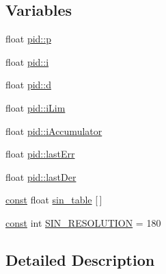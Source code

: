 \subsection*{Variables}
\begin{DoxyCompactItemize}
\item 
float \hyperlink{group___sine_ga8281b69c68be641d7b0dcf0322b3715f}{pid\-::p}
\item 
float \hyperlink{group___sine_ga97ebc09fc39d749940ebdc48926b8bb1}{pid\-::i}
\item 
float \hyperlink{group___sine_ga1c4d7f2ca382af4be8d036cc36bd9c31}{pid\-::d}
\item 
float \hyperlink{group___sine_ga2a3ee941dff64851693d27d04ece04f3}{pid\-::i\-Lim}
\item 
float \hyperlink{group___sine_gafb7f8463c8cefe80b65db478c349a0b1}{pid\-::i\-Accumulator}
\item 
float \hyperlink{group___sine_gab61187c1e1bf8e3f6b09501992bd744f}{pid\-::last\-Err}
\item 
float \hyperlink{group___sine_gae79ee69d35b5daccddb71cbe270fbbd1}{pid\-::last\-Der}
\item 
\hyperlink{group___n_a_m_e_ga7ae6d0e43244213b34de2c2b9aa30da6}{const} float \hyperlink{group___sine_ga70cc8b18ae100423fdb14030bc26eeb5}{sin\-\_\-table} \mbox{[}$\,$\mbox{]}
\item 
\hyperlink{group___n_a_m_e_ga7ae6d0e43244213b34de2c2b9aa30da6}{const} int \hyperlink{group___sine_gace095cad8be21b689623bd604ea20aaa}{S\-I\-N\-\_\-\-R\-E\-S\-O\-L\-U\-T\-I\-O\-N} = 180
\end{DoxyCompactItemize}


\subsection{Detailed Description}


